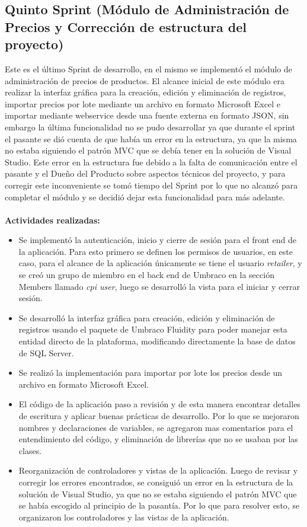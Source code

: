 \subsection{Quinto Sprint (Módulo de Administración de Precios y Corrección de estructura del proyecto)} 
Este es el último Sprint de desarrollo, en el mismo se implementó el módulo de administración de precios de productos. El alcance inicial de este módulo era realizar la interfaz gráfica para la creación, edición y eliminación de registros, importar precios por lote mediante un archivo en formato Microsoft Excel e importar mediante webservice desde una fuente externa en formato JSON, sin embargo la última funcionalidad no se pudo desarrollar ya que durante el sprint el pasante se dió cuenta de que había un error en la estructura, ya que la misma no estaba siguiendo el patrón MVC que se debía tener en la solución de Visual Studio. Este error en la estructura fue debido a la falta de comunicación entre el pasante y el Dueño del Producto sobre aspectos técnicos del proyecto, y para corregir este inconveniente se tomó tiempo del Sprint por lo que no alcanzó para completar el módulo y se decidió dejar esta funcionalidad para más adelante.
\\
\\
\textbf{Actividades realizadas:}
\begin{itemize} 
   \item Se implementó la autenticación, inicio y cierre de sesión para el front end de la aplicación. Para esto primero se definen los permisos de usuarios, en este caso, para el alcance de la aplicación únicamente se tiene el usuario \emph{retailer}, y se creó un grupo de miembro en el back end de Umbraco en la sección Members llamado \emph{cpi user}, luego se desarrolló la vista para el iniciar y cerrar sesión.
   \item Se desarrolló la interfaz gráfica para creación, edición y eliminación de registros usando el paquete de Umbraco Fluidity para poder manejar esta entidad directo de la plataforma, modificando directamente la base de datos de SQL Server.
   \item Se realizó la implementación para importar por lote los precios desde un archivo en formato Microsoft Excel.
   \item El código de la aplicación paso a revisión y de esta manera encontrar detalles de escritura y aplicar buenas prácticas de desarrollo. Por lo que se mejoraron nombres y declaraciones de variables, se agregaron mas comentarios para el entendimiento del código, y eliminación de librerías que no se usaban por las clases.
   \item Reorganización de controladores y vistas de la aplicación. Luego de revisar y corregir los errores encontrados, se consiguió un error en la estructura de la solución de Visual Studio, ya que no se estaba siguiendo el patrón MVC que se había escogido al principio de la pasantía. Por lo que para resolver esto, se organizaron los controladores y las vistas de la aplicación.
\end{itemize}

